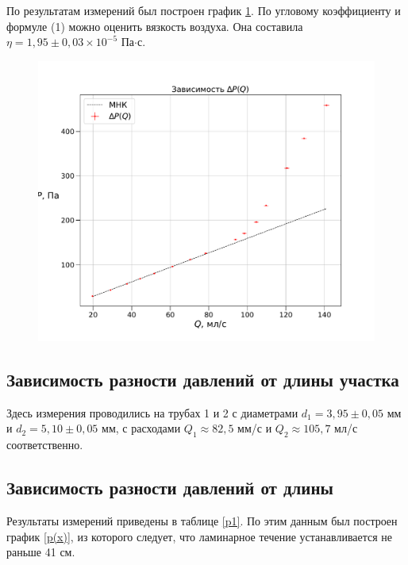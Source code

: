 \documentclass[a4paper,12pt]{article} %
\begin{document}
По результатам измерений был построен график \ref{p(q)}. По угловому коэффициенту и формуле (1) можно оценить вязкость воздуха. Она составила $\eta = 1,95 \pm 0,03 \times 10^{-5}$ Па$\cdot$с.

\begin{figure}[H]
    \centering
    \includegraphics[scale=0.65]{p(q).pdf}
    \label{p(q)}
\end{figure}

\subsection{Зависимость разности давлений от длины участка}

Здесь измерения проводились на трубах 1 и 2 с диаметрами $d_1 = 3,95 \pm 0,05$ мм и $d_2 = 5,10 \pm 0,05$ мм, с расходами $Q_1 \approx 82,5$ мм/с и $Q_2 \approx 105,7$ мл/с соответственно.

\subsection{Зависимость разности давлений от длины}

Результаты измерений приведены в таблице \ref{p1}. По этим данным был построен график \ref{p(x)}, из которого следует, что ламинарное течение устанавливается не раньше 41 см.
\end{document}
